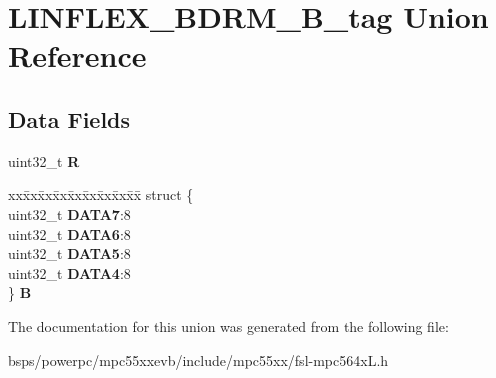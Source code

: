 \hypertarget{unionLINFLEX__BDRM__32B__tag}{}\section{L\+I\+N\+F\+L\+E\+X\+\_\+\+B\+D\+R\+M\+\_\+B\+\_\+tag Union Reference}
\label{unionLINFLEX__BDRM__32B__tag}
\subsection*{Data Fields}
\begin{DoxyCompactItemize}
\item 
\mbox{\label{unionLINFLEX__BDRM__32B__tag_a920c6e6e8c874b0ba16dd4d5736e401c}} 
uint32\+\_\+t {\bfseries R}
\item 
\mbox{\label{unionLINFLEX__BDRM__32B__tag_a5a3c6242738cc9f31d65d055874f104b}} 
\begin{tabbing}
xx\=xx\=xx\=xx\=xx\=xx\=xx\=xx\=xx\=\kill
struct \{\\
\>uint32\_t {\bfseries DATA7}:8\\
\>uint32\_t {\bfseries DATA6}:8\\
\>uint32\_t {\bfseries DATA5}:8\\
\>uint32\_t {\bfseries DATA4}:8\\
\} {\bfseries B}\\

\end{tabbing}\end{DoxyCompactItemize}


The documentation for this union was generated from the following file\+:\begin{DoxyCompactItemize}
\item 
bsps/powerpc/mpc55xxevb/include/mpc55xx/fsl-\/mpc564x\+L.\+h\end{DoxyCompactItemize}
